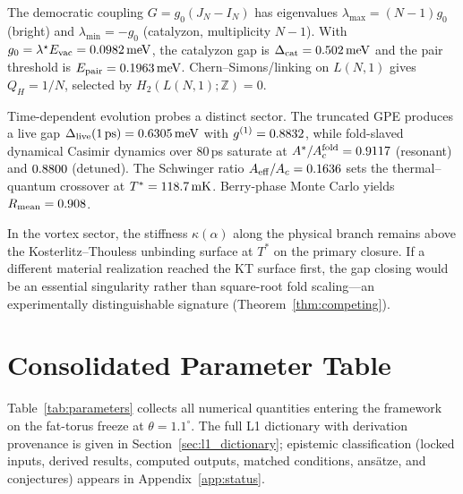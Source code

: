 \documentclass[11pt,letterpaper]{article}
\begin{document}
The democratic coupling $G=g_0(J_N-I_N)$ has eigenvalues $\lambda_{\max}=(N-1)g_0$ (bright) and $\lambda_{\min}=-g_0$ (catalyzon, multiplicity $N-1$). With $g_0=\lambda^\star E_{\mathrm{vac}}=0.0982\,\mathrm{meV}$, the catalyzon gap is $\Delta_{\mathrm{cat}}=0.502\,\mathrm{meV}$ and the pair threshold is $E_{\mathrm{pair}}=0.1963\,\mathrm{meV}$. Chern--Simons/linking on $L(N,1)$ gives $Q_H=1/N$, selected by $H_2(L(N,1);\mathbb{Z})=0$.

Time-dependent evolution probes a distinct sector. The truncated GPE produces a live gap $\Delta_{\mathrm{live}}(1\,\mathrm{ps})=0.6305\,\mathrm{meV}$ with $g^{(1)}=0.8832$, while fold-slaved dynamical Casimir dynamics over $80$\,ps saturate at $A^*/A_c^{\mathrm{fold}}=0.9117$ (resonant) and $0.8800$ (detuned). The Schwinger ratio $A_{\mathrm{eff}}/A_c=0.1636$ sets the thermal--quantum crossover at $T^*=118.7\,\mathrm{mK}$. Berry-phase Monte Carlo yields $R_{\mathrm{mean}}=0.908$.

In the vortex sector, the stiffness $\kappa(\alpha)$ along the physical branch remains above the Kosterlitz--Thouless unbinding surface at $T^*$ on the primary closure. If a different material realization reached the KT surface first, the gap closing would be an essential singularity rather than square-root fold scaling---an experimentally distinguishable signature (Theorem~\ref{thm:competing}).

\section{Consolidated Parameter Table}
\label{sec:results}

Table~\ref{tab:parameters} collects all numerical quantities entering the \TEVC{} framework on the fat-torus freeze at $\theta=1.1^\circ$. The full L1 dictionary with derivation provenance is given in Section~\ref{sec:l1_dictionary}; epistemic classification (locked inputs, derived results, computed outputs, matched conditions, ans\"atze, and conjectures) appears in Appendix~\ref{app:status}.
\end{document}
